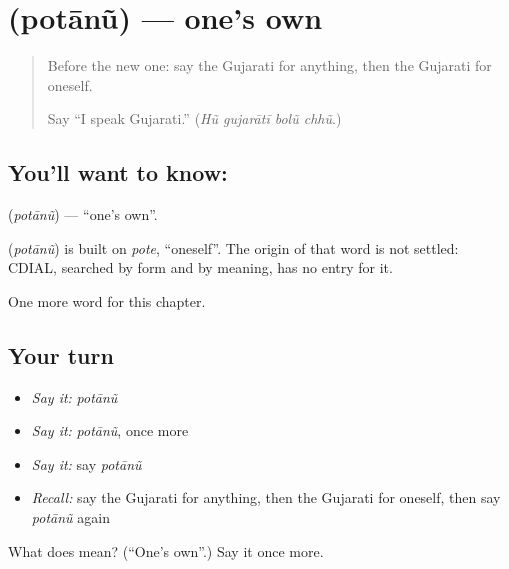 \section[\texorpdfstring{\gu{પોતાનું} (potānũ)}{પોતાનું (potānũ)}]{ (potānũ) — one's own}

\label{lesson:GU-C100-potanu}



\begin{quote}
Before the new one: say the Gujarati for anything, then the Gujarati for oneself.

Say \textquotedblleft{}I speak Gujarati.\textquotedblright{} (\emph{Hũ gujarātī bolũ chhũ}.)
\end{quote}

\subsection*{You'll want to know: }
\textbf{} (\emph{potānũ}) — \textquotedblleft{}one's own\textquotedblright{}.

\begin{cousinweb}
\textbf{} (\emph{potānũ}) is built on \emph{pote}, \textquotedblleft{}oneself\textquotedblright{}. The origin of that word is not settled: CDIAL, searched by form and by meaning, has no entry for it.
\end{cousinweb}

\begin{grammarlens}[title={What you've built}]
One more word for this chapter.
\end{grammarlens}

\subsection*{Your turn}
\begin{itemize}
\raggedright
  \item \emph{Say it:} \emph{potānũ}
  \item \emph{Say it:} \emph{potānũ}, once more
  \item \emph{Say it:} say \emph{potānũ}
  \item \emph{Recall:} say the Gujarati for anything, then the Gujarati for oneself, then say \emph{potānũ} again
\end{itemize}

\begin{tcolorbox}[breakable,colback=teal!4,colframe=teal!35!black,title={Before you move on}]
What does  mean? (\textquotedblleft{}One's own\textquotedblright{}.) Say it once more.
\end{tcolorbox}
